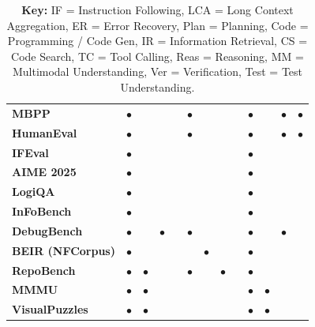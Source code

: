 \begin{table}[htbp]
{\begin{tabular}{l *{12}{c}}
\textbf{MBPP} & $\bullet$ &  &  &  & $\bullet$ &  &  &  & $\bullet$ &  & $\bullet$ & $\bullet$ \\
\rowcolor{gray!15} \textbf{HumanEval} & $\bullet$ &  &  &  & $\bullet$ &  &  &  & $\bullet$ &  & $\bullet$ & $\bullet$ \\
\textbf{IFEval} & $\bullet$ &  &  &  &  &  &  &  & $\bullet$ &  &  &  \\
\rowcolor{gray!15} \textbf{AIME 2025} & $\bullet$ &  &  &  &  &  &  &  & $\bullet$ &  &  &  \\
\textbf{LogiQA} & $\bullet$ &  &  &  &  &  &  &  & $\bullet$ &  &  &  \\
\rowcolor{gray!15} \textbf{InFoBench} & $\bullet$ &  &  &  &  &  &  &  & $\bullet$ &  &  &  \\
\textbf{DebugBench} & $\bullet$ &  & $\bullet$ &  & $\bullet$ &  &  &  & $\bullet$ &  & $\bullet$ &  \\
\rowcolor{gray!15} \textbf{BEIR (NFCorpus)} & $\bullet$ &  &  &  &  & $\bullet$ &  &  & $\bullet$ &  &  &  \\
\textbf{RepoBench} & $\bullet$ & $\bullet$ &  &  & $\bullet$ &  & $\bullet$ &  & $\bullet$ &  &  &  \\
\rowcolor{gray!15} \textbf{MMMU} & $\bullet$ & $\bullet$ &  &  &  &  &  &  & $\bullet$ & $\bullet$ &  &  \\
\textbf{VisualPuzzles} & $\bullet$ & $\bullet$ &  &  &  &  &  &  & $\bullet$ & $\bullet$ &  &  \\
\bottomrule
\end{tabular}%
}
\caption{\textbf{Key:} IF = Instruction Following, LCA = Long Context Aggregation, ER = Error Recovery, Plan = Planning, Code = Programming / Code Gen, IR = Information Retrieval, CS = Code Search, TC = Tool Calling, Reas = Reasoning, MM = Multimodal Understanding, Ver = Verification, Test = Test Understanding.}
\label{tab:capability_mapping}
\end{table}
